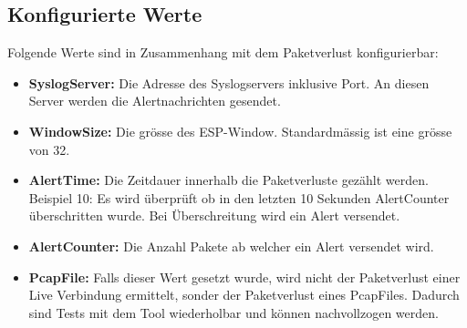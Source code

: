 \subsection{Konfigurierte Werte}
Folgende Werte sind in Zusammenhang mit dem Paketverlust konfigurierbar:

\begin{itemize}
  \item \textbf{SyslogServer:} Die Adresse des Syslogservers inklusive Port. An diesen Server werden die Alertnachrichten gesendet.
  \item \textbf{WindowSize:} Die grösse des ESP-Window. Standardmässig ist eine grösse von 32. 
  \item \textbf{AlertTime:} Die Zeitdauer innerhalb die Paketverluste gezählt werden. Beispiel 10: Es wird überprüft ob in den letzten 10 Sekunden AlertCounter überschritten wurde. Bei Überschreitung wird ein Alert versendet.
    \item \textbf{AlertCounter:} Die Anzahl Pakete ab welcher ein Alert versendet wird.
  \item \textbf{PcapFile:} Falls dieser Wert gesetzt wurde, wird nicht der Paketverlust einer Live Verbindung ermittelt, sonder der Paketverlust eines PcapFiles. Dadurch sind Tests mit dem Tool wiederholbar und können nachvollzogen werden.
\end{itemize}